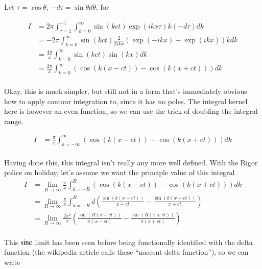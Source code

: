 Let $\tau = \cos\theta$, $-d\tau = \sin\theta d\theta$, for

\begin{align*}
I
&= 2 \pi \int_{\tau=1}^{-1} \int_{k=0}^\infty %
\sin\left( k c t \right) \exp\left( i k x \tau \right)
k (-d\tau) dk \\
&= -2 \pi \int_{k=0}^\infty %
\sin\left( k c t \right)
\frac{2}{2i k x} \left( {\exp\left( -i k x \right) } -{\exp\left( i k x \right) } \right)
k dk \\
&= \frac{4 \pi }{x} \int_{k=0}^\infty %
\sin\left( k c t \right)
\sin\left( k x \right)
dk \\
&= \frac{2 \pi }{x} \int_{k=0}^\infty %
\left( \cos\left( k (x-c t) \right) -\cos\left( k (x+c t) \right) \right)
 dk \\
\end{align*}

Okay, this is much simpler, but still not in a form that's immediately obvious how to apply contour integration to, since it has no poles.
The integral
kernel here is however an even function,
so we can use the trick of doubling the integral range.

\begin{align*}
I &= \frac{\pi }{x} \int_{k=-\infty}^\infty \left( \cos\left( k (x-c t) \right) -\cos\left( k (x+c t) \right) \right) dk \\
\end{align*}

Having done this, this integral isn't really any more well defined.  With the Rigor police on holiday, let's assume we want the
principle value of this integral
\begin{align*}
I
&= \lim_{R \rightarrow \infty} \frac{\pi }{x} \int_{k=-R}^R \left( \cos\left( k (x-c t) \right) -\cos\left( k (x+c t) \right) \right) dk \\
&= \lim_{R \rightarrow \infty} \frac{\pi }{x} \int_{k=-R}^R d \left( \frac{\sin\left( k (x-c t) \right)}{ x - c t} - \frac{\sin\left( k (x+c t) \right)}{x + c t} \right) \\
&= \lim_{R \rightarrow \infty} \frac{2 \pi^2 }{x} \left( \frac{\sin\left( R (x-c t) \right)}{ \pi(x - c t)} - \frac{\sin\left( R (x+c t) \right)}{\pi(x + c t)} \right) \\
\end{align*}

This $\operatorname{sinc}$ limit has been seen before being functionally identified with the delta function (the wikipedia article calls these ``nascent delta function''), so we can write

